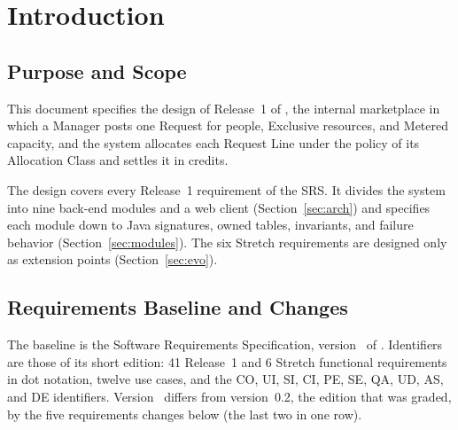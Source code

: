 \section{Introduction}\label{sec:intro}
\enlargethispage{2\baselineskip}%

\subsection{Purpose and Scope}

This document specifies the design of Release~1 of \SRSproduct{}, the internal marketplace in which a Manager posts one Request for people, Exclusive resources, and Metered capacity, and the system allocates each Request Line under the policy of its Allocation Class and settles it in credits.

The design covers every Release~1 requirement of the SRS. It divides the system into nine back-end modules and a web client (Section~\ref{sec:arch}) and specifies each module down to Java signatures, owned tables, invariants, and failure behavior (Section~\ref{sec:modules}). The six Stretch requirements are designed only as extension points (Section~\ref{sec:evo}).

\subsection{Requirements Baseline and Changes}

The baseline is the \SRSproduct{} Software Requirements Specification, version~\SRSversion{} of \SRSdate{}. Identifiers are those of its short edition: 41 Release~1 and 6 Stretch functional requirements in dot notation, twelve use cases, and the CO, UI, SI, CI, PE, SE, QA, UD, AS, and DE identifiers. Version~\SRSversion{} differs from version~0.2, the edition that was graded, by the five requirements changes below (the last two in one row).


